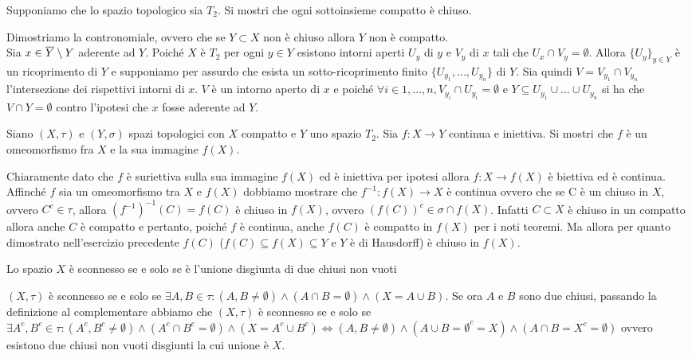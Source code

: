 \begin{es}
  Supponiamo che lo spazio topologico sia $ T_2 $. Si mostri che ogni sottoinsieme compatto è chiuso.
\end{es}
%
Dimostriamo la contronomiale, ovvero che se $ Y \subset X $ non è chiuso allora $ Y $ non è compatto. \\ Sia $ x \in \overline{Y} \setminus Y $ aderente ad $ Y $. Poiché $ X $ è $ T_2 $ per ogni $ y \in Y $ esistono intorni aperti $ U_y $ di $ y $ e $ V_y $ di $ x $ tali che $ U_x \cap V_y = \emptyset $. Allora $ \{U_y\}_{y \in Y} $ è un ricoprimento di $ Y $ e supponiamo per assurdo che esista un sotto-ricoprimento finito $ \{U_{y_1}, \ldots, U_{y_n}\} $ di $ Y $. Sia quindi $ V = V_{y_1} \cap V_{y_n} $ l'intersezione dei rispettivi intorni di $ x $. $ V $ è un intorno aperto di $ x $ e poiché $ \forall i \in {1, \ldots, n}, V_{y_i} \cap U_{y_i} = \emptyset $ e $ Y \subseteq U_{y_1} \cup \ldots \cup U_{y_n} $ si ha che $ V \cap Y = \emptyset $ contro l'ipotesi che $ x $ fosse aderente ad $ Y $.

\begin{es}
  Siano $ (X, \tau) $ e $ (Y, \sigma) $ spazi topologici con $ X $ compatto e $ Y $ uno spazio $ T_2 $. Sia $ f \colon X \to Y $ continua e iniettiva. Si mostri che $ f $ è un omeomorfismo fra $ X $ e la sua immagine $ f(X) $.
\end{es}
%
Chiaramente dato che $ f $ è suriettiva sulla sua immagine $ f(X) $ ed è iniettiva per ipotesi allora $ f \colon X \to f(X) $ è biettiva ed è continua. Affinché $ f $ sia un omeomorfismo tra $ X $ e $ f(X) $ dobbiamo mostrare che $ f^{-1} \colon f(X) \to X  $ è continua ovvero che se C è un chiuso in $ X $, ovvero $ C^c \in \tau $, allora $ (f^{-1})^{-1}(C) = f(C) $ è chiuso in $ f(X) $, ovvero $ (f(C))^c \in \sigma \cap f(X) $. Infatti $ C \subset X $ è chiuso in un compatto allora anche $ C $ è compatto e pertanto, poiché $ f $ è continua,  anche $ f(C) $ è compatto in $ f(X) $ per i noti teoremi. Ma allora per quanto dimostrato nell'esercizio precedente $ f(C) $ ($ f(C) \subseteq f(X) \subseteq Y $ e $ Y $ è di Hausdorff) è chiuso in $ f(X) $.

\begin{es}
  Lo spazio $ X $ è sconnesso se e solo se è l'unione disgiunta di due chiusi non vuoti
\end{es}
%
$ (X, \tau) $ è sconnesso se e solo se $ \exists A, B \in \tau: (A, B \neq \emptyset) \wedge (A \cap B = \emptyset) \wedge (X = A \cup B) $. Se ora $ A $ e $ B $ sono due chiusi, passando la definizione al complementare abbiamo che $ (X, \tau) $ è sconnesso se e solo se $ \exists A^c, B^c \in \tau : (A^c, B^c \neq \emptyset) \wedge (A^c \cap B^c = \emptyset) \wedge (X = A^c \cup B^c) \iff (A, B \neq \emptyset) \wedge (A \cup B = \emptyset^c = X) \wedge (A \cap B = X^c = \emptyset) $ ovvero esistono due chiusi non vuoti disgiunti la cui unione è $ X $.

